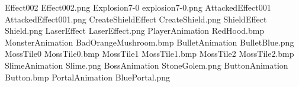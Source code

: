 Effect002
E f f e c t 0 0 2 . p n g 
 Explosion7-0
e x p l o s i o n 7 - 0 . p n g 
 AttackedEffect001
A t t a c k e d E f f e c t 0 0 1 . p n g 
 CreateShieldEffect
C r e a t e S h i e l d . p n g 
 ShieldEffect
S h i e l d . p n g 
 LaserEffect
L a s e r E f f e c t . p n g 
 PlayerAnimation
R e d H o o d . b m p 
 MonsterAnimation
B a d O r a n g e M u s h r o o m . b m p 
 BulletAnimation
B u l l e t B l u e . p n g 
 MossTile0
M o s s T i l e 0 . b m p 
 MossTile1
M o s s T i l e 1 . b m p 
 MossTile2
M o s s T i l e 2 . b m p 
 SlimeAnimation
S l i m e . p n g 
 BossAnimation
S t o n e G o l e m . p n g 
 ButtonAnimation
B u t t o n . b m p 
 PortalAnimation
B l u e P o r t a l . p n g 
 
